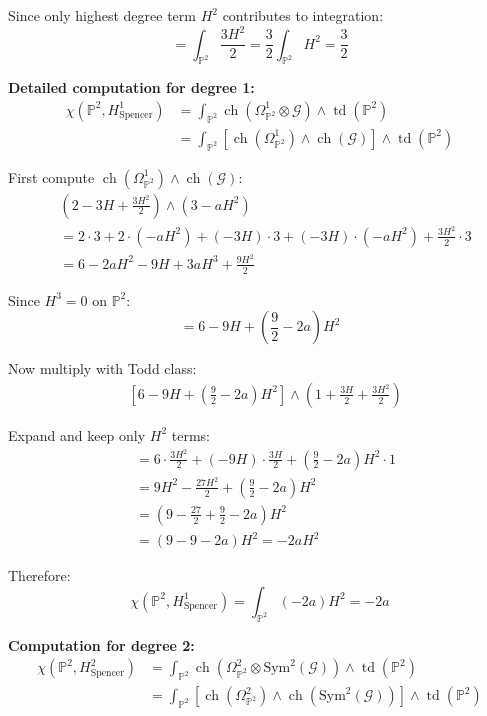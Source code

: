 \documentclass[a4paper,12pt]{extarticle}
\newcommand{\ch}{\operatorname{ch}}
\newcommand{\td}{\operatorname{td}}
\theoremstyle{definition}
\begin{document}
Since only highest degree term $H^2$ contributes to integration:
$$= \int_{\mathbb{P}^2} \frac{3H^2}{2} = \frac{3}{2} \int_{\mathbb{P}^2} H^2 = \frac{3}{2}$$

\textbf{Detailed computation for degree 1:}
\begin{align}
\chi(\mathbb{P}^2, H^1_{\mathrm{Spencer}}) &= \int_{\mathbb{P}^2} \ch(\Omega^1_{\mathbb{P}^2} \otimes \mathcal{G}) \wedge \td(\mathbb{P}^2) \\
&= \int_{\mathbb{P}^2} [\ch(\Omega^1_{\mathbb{P}^2}) \wedge \ch(\mathcal{G})] \wedge \td(\mathbb{P}^2)
\end{align}

First compute $\ch(\Omega^1_{\mathbb{P}^2}) \wedge \ch(\mathcal{G})$:
\begin{align}
&\left(2 - 3H + \frac{3H^2}{2}\right) \wedge (3 - aH^2) \\
&= 2 \cdot 3 + 2 \cdot (-aH^2) + (-3H) \cdot 3 + (-3H) \cdot (-aH^2) + \frac{3H^2}{2} \cdot 3 \\
&= 6 - 2aH^2 - 9H + 3aH^3 + \frac{9H^2}{2}
\end{align}

Since $H^3 = 0$ on $\mathbb{P}^2$:
$$= 6 - 9H + \left(\frac{9}{2} - 2a\right)H^2$$

Now multiply with Todd class:
\begin{align}
&\left[6 - 9H + \left(\frac{9}{2} - 2a\right)H^2\right] \wedge \left(1 + \frac{3H}{2} + \frac{3H^2}{2}\right)
\end{align}

Expand and keep only $H^2$ terms:
\begin{align}
&= 6 \cdot \frac{3H^2}{2} + (-9H) \cdot \frac{3H}{2} + \left(\frac{9}{2} - 2a\right)H^2 \cdot 1 \\
&= 9H^2 - \frac{27H^2}{2} + \left(\frac{9}{2} - 2a\right)H^2 \\
&= \left(9 - \frac{27}{2} + \frac{9}{2} - 2a\right)H^2 \\
&= \left(9 - 9 - 2a\right)H^2 = -2aH^2
\end{align}

Therefore:
$$\chi(\mathbb{P}^2, H^1_{\mathrm{Spencer}}) = \int_{\mathbb{P}^2} (-2a)H^2 = -2a$$

\textbf{Computation for degree 2:}
\begin{align}
\chi(\mathbb{P}^2, H^2_{\mathrm{Spencer}}) &= \int_{\mathbb{P}^2} \ch(\Omega^2_{\mathbb{P}^2} \otimes \mathrm{Sym}^2(\mathcal{G})) \wedge \td(\mathbb{P}^2) \\
&= \int_{\mathbb{P}^2} [\ch(\Omega^2_{\mathbb{P}^2}) \wedge \ch(\mathrm{Sym}^2(\mathcal{G}))] \wedge \td(\mathbb{P}^2)
\end{align}
\end{document}
